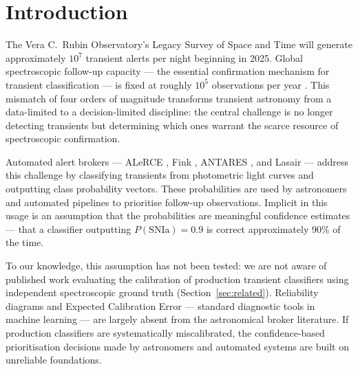 \documentclass[twocolumn]{aastex631}
\begin{document}
\begin{abstract}
These results demonstrate that miscalibration is systematic,
broker-dependent, and consequential for confidence-based follow-up
prioritisation. In this bright spectroscopic sample, ALeRCE's
probabilities are reliably correctable post hoc, while Fink's
available binary scores are unsuitable as general-purpose SNIa
posteriors. We argue that calibration metrics should be reported
alongside accuracy — and alongside ranking metrics — for production
astronomical classifiers, and that calibrated ALeRCE outputs are a
promising starting point for deferral-aware classification
frameworks, pending validation on fainter LSST-like samples.
\end{abstract}


\section{Introduction}
\label{sec:intro}
The Vera C.\ Rubin Observatory's Legacy Survey of Space and Time 
\citep[LSST;][]{Ivezic2019} will generate approximately $10^7$ 
transient alerts per night beginning in 2025. Global spectroscopic 
follow-up capacity — the essential confirmation mechanism for 
transient classification — is fixed at roughly $10^5$ observations 
per year \citep{Hambly2022}. This mismatch of four orders of magnitude 
transforms transient astronomy from a data-limited to a 
decision-limited discipline: the central challenge is no longer 
detecting transients but determining which ones warrant the scarce 
resource of spectroscopic confirmation.

Automated alert brokers — ALeRCE \citep{Forster2021}, Fink 
\citep{Moller2021}, ANTARES \citep{Narayan2018}, and Lasair 
\citep{Smith2019} — address this challenge by classifying 
transients from photometric light curves and outputting class 
probability vectors. These probabilities are used by astronomers 
and automated pipelines to prioritise follow-up observations. 
Implicit in this usage is an assumption that the probabilities 
are meaningful confidence estimates — that a classifier outputting 
$P(\mathrm{SNIa}) = 0.9$ is correct approximately 90\% of the time.

To our knowledge, this assumption has not been tested: we are not
aware of published work evaluating the calibration of production
transient classifiers using independent spectroscopic ground truth
(Section~\ref{sec:related}). Reliability diagrams and Expected
Calibration Error \citep[ECE;][]{Naeini2015} — standard diagnostic
tools in machine learning — are largely absent from the astronomical
broker literature. If production classifiers are systematically
miscalibrated, the confidence-based prioritisation decisions made by
astronomers and automated systems are built on unreliable
foundations.
\end{document}
